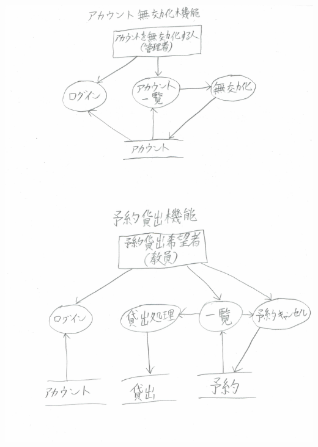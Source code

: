 \documentclass[a4paper]{jarticle}
\begin{document}
\begin{enumerate}
\begin{center}
 \includegraphics[width=15cm]{compressedjpg/DFD2.JPG}
 \end{center}
\end{enumerate}
\end{document}
